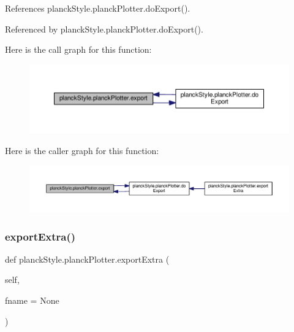 References planck\+Style.\+planck\+Plotter.\+do\+Export().



Referenced by planck\+Style.\+planck\+Plotter.\+do\+Export().

Here is the call graph for this function\+:
\nopagebreak
\begin{figure}[H]
\begin{center}
\leavevmode
\includegraphics[width=350pt]{classplanckStyle_1_1planckPlotter_a0100970f877b5a5267dc1e3dcde09111_cgraph}
\end{center}
\end{figure}
Here is the caller graph for this function\+:
\nopagebreak
\begin{figure}[H]
\begin{center}
\leavevmode
\includegraphics[width=350pt]{classplanckStyle_1_1planckPlotter_a0100970f877b5a5267dc1e3dcde09111_icgraph}
\end{center}
\end{figure}
\mbox{\label{classplanckStyle_1_1planckPlotter_a0097bf752f839ecc435362ff049c751e}} 
\subsubsection{\texorpdfstring{export\+Extra()}{exportExtra()}}
{\footnotesize\ttfamily def planck\+Style.\+planck\+Plotter.\+export\+Extra (\begin{DoxyParamCaption}\item[{}]{self,  }\item[{}]{fname = {\ttfamily None} }\end{DoxyParamCaption})}



